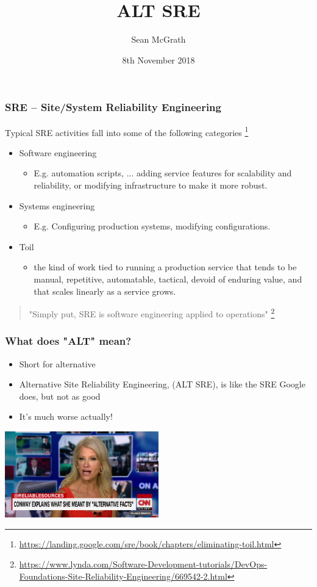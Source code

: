 \documentclass{beamer}
\title[]{ALT SRE}
\author{Sean McGrath}
\institute[TCD]
{
Resarch IT \\
Trinity College Dublin \\
\medskip
\textit{sean.mcgrath@tcd.ie} 
}
\date{8th November 2018}
\begin{document}
\begin{frame}
\titlepage
\end{frame}

\begin{frame}
\frametitle{SRE – Site/System Reliability Engineering}

Typical SRE activities fall into some of the following categories
\footnote{\url{https://landing.google.com/sre/book/chapters/eliminating-toil.html}}

\begin{itemize}
\item Software engineering
	\begin{itemize}
	\item E.g. automation scripts, ... adding service features for scalability and reliability, or modifying infrastructure to make it more robust.
	\end{itemize}
\item Systems engineering
	\begin{itemize}
	\item E.g. Configuring production systems, modifying configurations. 
	\end{itemize}
\item Toil
	\begin{itemize}
	\item the kind of work tied to running a production service that tends to be manual, repetitive, automatable, tactical, devoid of enduring value, and that scales linearly as a service grows.
	\end{itemize}
\end{itemize}
\begin{quote}
"Simply put, SRE is software engineering applied to operations"
\footnote{\url{https://www.lynda.com/Software-Development-tutorials/DevOps-Foundations-Site-Reliability-Engineering/669542-2.html}}
\end{quote}
\end{frame}

\begin{frame}
\frametitle{What does "ALT" mean?}
	\begin{itemize}
	\item Short for alternative
	\item Alternative Site Reliability Engineering, (ALT SRE), is like the SRE Google does, but not as good
	\item It's much worse actually!
	\end{itemize}
    \begin{center}
     \includegraphics[width=0.5\textwidth]{imgs/kellyanne.png}
     \end{center}
\end{frame}
\end{document}

